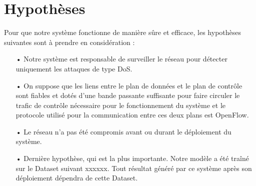 \section{Hypothèses}
Pour que notre système fonctionne de manière sûre et efficace, les hypothèses suivantes sont à prendre en considération :\\
\begin{itemize}
\item[•] Notre système est responsable de surveiller le réseau pour détecter uniquement les attaques de type DoS.\\
\item[•] On suppose que les liens entre le plan de données et le plan de contrôle sont fiables et dotés d’une bande passante suffisante pour faire circuler le trafic de contrôle nécessaire pour le fonctionnement du système et le protocole utilisé pour la communication entre ces deux plans est OpenFlow.\\
\item[•] Le réseau n’a pas été compromis avant ou durant le déploiement du système.\\
\item[•] Dernière hypothèse, qui est la plus importante. Notre modèle a été traîné sur le Dataset suivant xxxxxx. Tout résultat généré par ce système après son déploiement dépendra de cette Dataset.
\end{itemize}

 